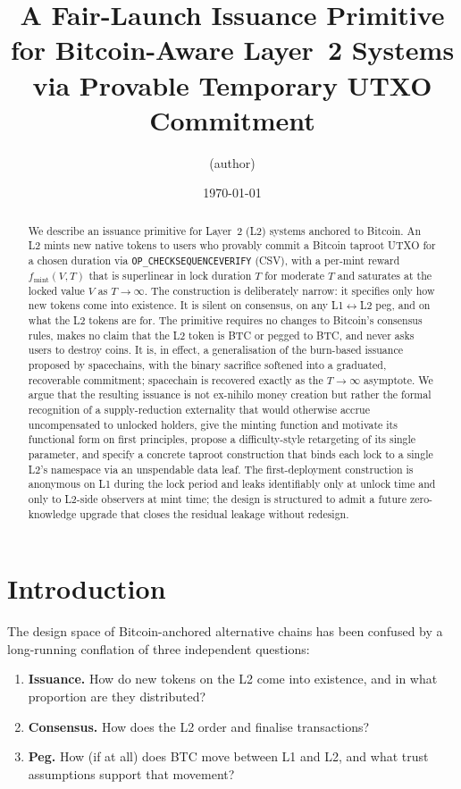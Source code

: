 \documentclass[11pt,a4paper]{article}
\title{\textbf{A Fair-Launch Issuance Primitive for Bitcoin-Aware Layer~2 Systems via Provable Temporary UTXO Commitment}}
\author{(author)}
\date{\today}
\newcommand{\fmint}{f_{\mathrm{mint}}}
\begin{document}
\maketitle

\begin{abstract}
\noindent We describe an issuance primitive for Layer~2 (L2) systems anchored to Bitcoin. An L2 mints new native tokens to users who provably commit a Bitcoin taproot UTXO for a chosen duration via \texttt{OP\_CHECKSEQUENCEVERIFY} (CSV), with a per-mint reward $\fmint(V, T)$ that is superlinear in lock duration $T$ for moderate $T$ and saturates at the locked value $V$ as $T \to \infty$. The construction is deliberately narrow: it specifies only how new tokens come into existence. It is silent on consensus, on any L1$\leftrightarrow$L2 peg, and on what the L2 tokens are for. The primitive requires no changes to Bitcoin's consensus rules, makes no claim that the L2 token is BTC or pegged to BTC, and never asks users to destroy coins. It is, in effect, a generalisation of the burn-based issuance proposed by spacechains, with the binary sacrifice softened into a graduated, recoverable commitment; spacechain is recovered exactly as the $T \to \infty$ asymptote. We argue that the resulting issuance is not ex-nihilo money creation but rather the formal recognition of a supply-reduction externality that would otherwise accrue uncompensated to unlocked holders, give the minting function and motivate its functional form on first principles, propose a difficulty-style retargeting of its single parameter, and specify a concrete taproot construction that binds each lock to a single L2's namespace via an unspendable data leaf. The first-deployment construction is anonymous on L1 during the lock period and leaks identifiably only at unlock time and only to L2-side observers at mint time; the design is structured to admit a future zero-knowledge upgrade that closes the residual leakage without redesign.
\end{abstract}

\section{Introduction}

The design space of Bitcoin-anchored alternative chains has been confused by a long-running conflation of three independent questions:

\begin{enumerate}[label=(\roman*),leftmargin=*]
  \item \textbf{Issuance.} How do new tokens on the L2 come into existence, and in what proportion are they distributed?
  \item \textbf{Consensus.} How does the L2 order and finalise transactions?
  \item \textbf{Peg.} How (if at all) does BTC move between L1 and L2, and what trust assumptions support that movement?
\end{enumerate}
\end{document}
